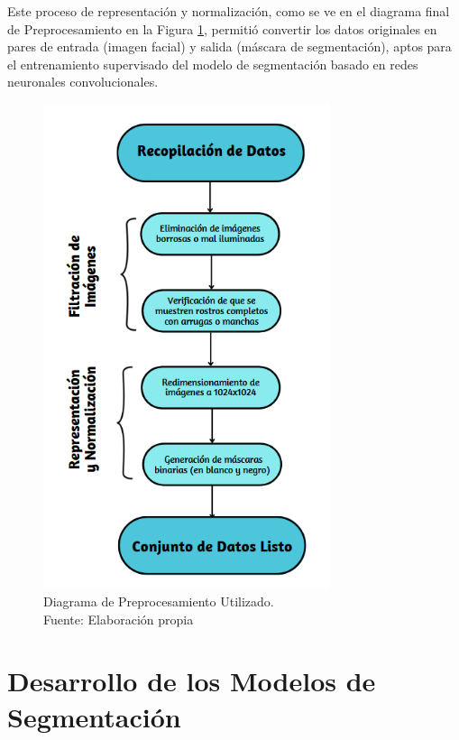 Este proceso de representación y normalización, como se ve en el diagrama final de Preprocesamiento en la Figura \ref{4:fig3}, permitió convertir los datos originales en pares de entrada (imagen facial) y salida (máscara de segmentación), aptos para el entrenamiento supervisado del modelo de segmentación basado en redes neuronales convolucionales.

\begin{figure}[h]
	\begin{center}
		\includegraphics[width=0.75\textwidth]{4/figures/diagrama final prepo.png}
		\caption[Diagrama de Preprocesamiento Utilizado]{Diagrama de Preprocesamiento Utilizado.\\
		Fuente: Elaboración propia}
		\label{4:fig3}
	\end{center}
\end{figure}
\clearpage
\newpage
\section{Desarrollo de los Modelos de Segmentación}

